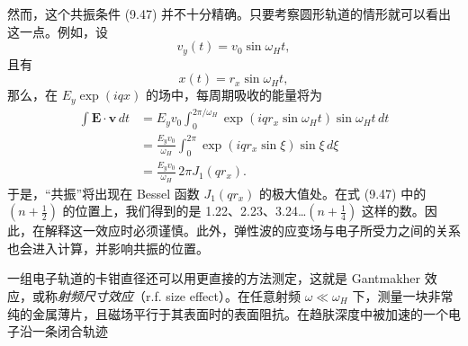 然而，这个共振条件 (9.47) 并不十分精确。只要考察圆形轨道的情形就可以看出这一点。例如，设
\begin{equation*}
v_{y}(t)=v_{0}\sin\omega_H t, \tag{9.48}
\end{equation*}
且有
\begin{equation*}
x(t)=r_{x}\sin\omega_H t, \tag{9.49}
\end{equation*}
那么，在 $E_{y}\exp(iqx)$ 的场中，每周期吸收的能量将为
\begin{align*}
\int\mathbf{E}\cdot\mathbf{v}\,dt&=E_{y}v_{0}\int_{0}^{2\pi/\omega_H}\exp(iqr_{x}\sin\omega_H t)\sin\omega_H t\,dt\\
&=\frac{E_{y}v_{0}}{\omega_H}\int_{0}^{2\pi}\exp(iqr_{x}\sin\xi)\sin\xi\,d\xi\\
&=\frac{E_{y}v_{0}}{\omega_H}\,2\pi J_{1}(qr_{x}). \tag{9.50}
\end{align*}
于是，“共振”将出现在 Bessel 函数 $J_{1}(qr_{x})$ 的极大值处。在式 (9.47) 中的 $(n+\frac{1}{2})$ 的位置上，我们得到的是 1.22、2.23、3.24…$(n+\frac{1}{4})$ 这样的数。因此，在解释这一效应时必须谨慎。此外，弹性波的应变场与电子所受力之间的关系也会进入计算，并影响共振的位置。


一组电子轨道的卡钳直径还可以用更直接的方法测定，这就是 Gantmakher 效应，或称\emph{射频尺寸效应}（r.f. size effect）。在任意射频 $\omega\ll\omega_H$ 下，测量一块非常纯的金属薄片，且磁场平行于其表面时的表面阻抗。在趋肤深度中被加速的一个电子沿一条闭合轨迹
